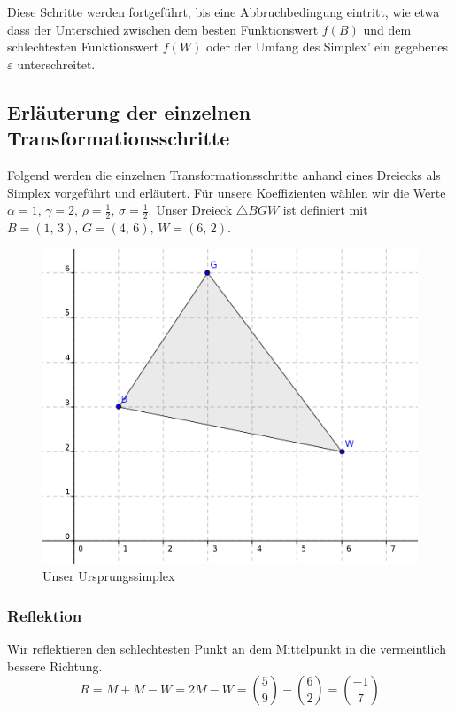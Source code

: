 \documentclass[naustrian]{article}
\begin{document}
Diese Schritte werden fortgeführt, bis eine Abbruchbedingung eintritt,
wie etwa dass der Unterschied zwischen dem besten Funktionswert $f(B)$
und dem schlechtesten Funktionswert $f(W)$ oder der Umfang des Simplex' ein gegebenes $\varepsilon$
unterschreitet.

\subsection{Erläuterung der einzelnen Transformationsschritte}

Folgend werden die einzelnen Transformationsschritte anhand eines
Dreiecks als Simplex vorgeführt und erläutert. Für unsere Koeffizienten
wählen wir die Werte $\alpha=1,\,\gamma=2,\,\rho=\frac{1}{2},\,\sigma=\frac{1}{2}$.
Unser Dreieck $\triangle BGW$ ist definiert mit $B=(1,\,3),\,G=(4,\,6),\,W=(6,\,2)$.

\begin{figure}[H]
    \centering
    \includegraphics{nelder_mead/triangle_bgw}
    \caption{Unser Ursprungssimplex}
\end{figure}

\subsubsection{Reflektion}

Wir reflektieren den schlechtesten Punkt an dem Mittelpunkt in die
vermeintlich bessere Richtung.
\[
    R=M+M-W=2M-W=\binom{5}{9}-\binom{6}{2}=\binom{-1}{7}
\]
\end{document}
